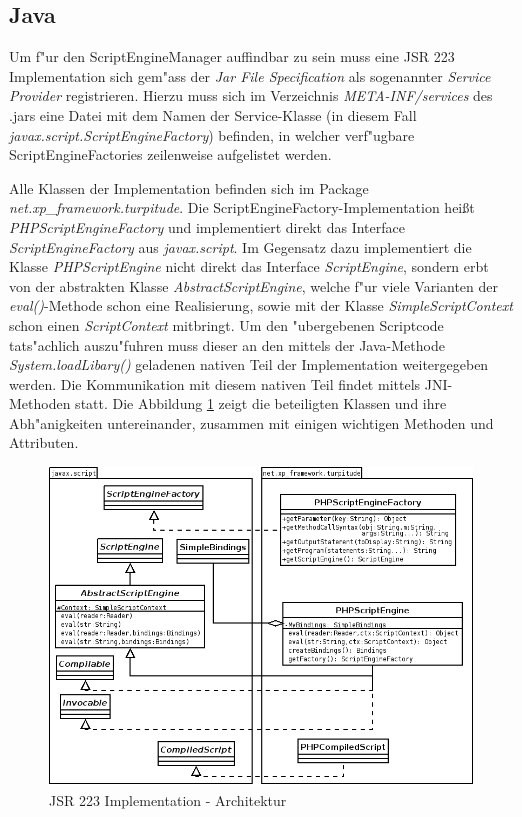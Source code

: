 \subsection{Java}
\label{sec:chap1:design:java}

Um f"ur den ScriptEngineManager auffindbar zu sein muss eine JSR 223 Implementation sich gem"ass der \emph{Jar File Specification} \cite{JARSPEC} 
als sogenannter \emph{Service Provider} registrieren. Hierzu muss sich im Verzeichnis \emph{META-INF/services} des .jars eine Datei
mit dem Namen der Service-Klasse (in diesem Fall \emph{javax.script.ScriptEngineFactory}) befinden, in welcher verf"ugbare 
ScriptEngineFactories zeilenweise aufgelistet werden.

Alle Klassen der Implementation befinden sich im Package \emph{net.xp\_framework.turpitude}. 
Die ScriptEngineFactory-Implementation hei\ss t \emph{PHPScriptEngineFactory} und implementiert direkt das Interface 
\emph{ScriptEngineFactory} aus \emph{javax.script}. Im Gegensatz dazu implementiert die Klasse \emph{PHPScriptEngine} nicht
direkt das Interface \emph{ScriptEngine}, sondern erbt von der abstrakten Klasse \emph{AbstractScriptEngine}, welche f"ur
viele Varianten der \emph{eval()}-Methode schon eine Realisierung, sowie mit der Klasse \emph{SimpleScriptContext} schon einen 
\emph{ScriptContext} mitbringt. Um den "ubergebenen Scriptcode tats"achlich auszu"fuhren muss dieser an den mittels der Java-Methode
\emph{System.loadLibary()} geladenen nativen Teil der Implementation weitergegeben werden. Die Kommunikation mit diesem
nativen Teil findet mittels JNI-Methoden statt.
Die Abbildung \ref{fig:jsr223impl} zeigt die beteiligten Klassen und ihre Abh"anigkeiten untereinander,
zusammen mit einigen wichtigen Methoden und Attributen. 

\begin{figure}[h]
\includegraphics[width=\textwidth]{chap1/img/turpitude.png}
\caption{JSR 223 Implementation - Architektur}
\label{fig:jsr223impl}
\end{figure}

